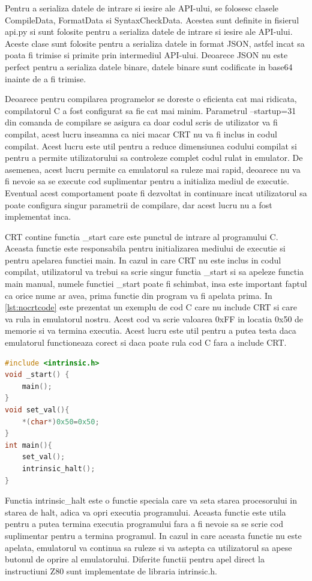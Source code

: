 \documentclass[titlepage,12pt]{article}
\DeclareRobustCommand{\code}[1]{{\ttfamily\small #1}}
\begin{document}
Pentru a serializa datele de intrare si iesire ale API-ului, se folosesc clasele \code{CompileData}, \code{FormatData} si \code{SyntaxCheckData}. Acestea sunt definite in fisierul \code{api.py} si sunt folosite pentru a serializa datele de intrare si iesire ale API-ului. Aceste clase sunt folosite pentru a serializa datele in format JSON, astfel incat sa poata fi trimise si primite prin intermediul API-ului.
Deoarece JSON nu este perfect pentru a serializa datele binare, datele binare sunt codificate in \code{base64} inainte de a fi trimise.

Deoarece pentru compilarea programelor se doreste o eficienta cat mai ridicata, compilatorul C a fost configurat sa fie cat mai minim. Parametrul \code{--startup=31} din comanda de compilare se asigura ca doar codul scris de utilizator va fi compilat, acest lucru inseamna ca nici macar \ac{CRT} nu va fi inclus in codul compilat. Acest lucru este util pentru a reduce dimensiunea codului compilat si pentru a permite utilizatorului sa controleze complet codul rulat in emulator. De asemenea, acest lucru permite ca emulatorul sa ruleze mai rapid, deoarece nu va fi nevoie sa se execute cod suplimentar pentru a initializa mediul de executie. Eventual acest comportament poate fi dezvoltat in continuare incat utilizatorul sa poate configura singur parametrii de compilare, dar acest lucru nu a fost implementat inca.

\ac {CRT} contine functia \code{\_start} care este punctul de intrare al programului C. Aceasta functie este responsabila pentru initializarea mediului de executie si pentru apelarea functiei \code{main}. In cazul in care \ac {CRT} nu este inclus in codul compilat, utilizatorul va trebui sa scrie singur functia \code{\_start} si sa apeleze functia \code{main} manual, numele functiei \code{\_start} poate fi schimbat, insa este important faptul ca orice nume ar avea, prima functie din program va fi apelata prima. In \cref{lst:nocrtcode} este prezentat un exemplu de cod C care nu include \ac {CRT} si care va rula in emulatorul nostru. Acest cod va scrie valoarea \code{0xFF} in locatia \code{0x50} de memorie si va termina executia. Acest lucru este util pentru a putea testa daca emulatorul functioneaza corect si daca poate rula cod C fara a include \ac{CRT}.
\begin{lstlisting}[language=C,caption={Cod C fara CRT},label={lst:nocrtcode}]
#include <intrinsic.h>
void _start() {
    main();
}
void set_val(){
    *(char*)0x50=0x50;
}
int main(){
    set_val();
    intrinsic_halt();
}
\end{lstlisting}
Functia \code{intrinsic\_halt} este o functie speciala care va seta starea procesorului in starea de \code{halt}, adica va opri executia programului. Aceasta functie este utila pentru a putea termina executia programului fara a fi nevoie sa se scrie cod suplimentar pentru a termina programul. In cazul in care aceasta functie nu este apelata, emulatorul va continua sa ruleze si va astepta ca utilizatorul sa apese butonul de oprire al emulatorului. Diferite functii pentru apel direct la instructiuni Z80 sunt implementate de libraria \code{intrinsic.h}.
\end{document}

